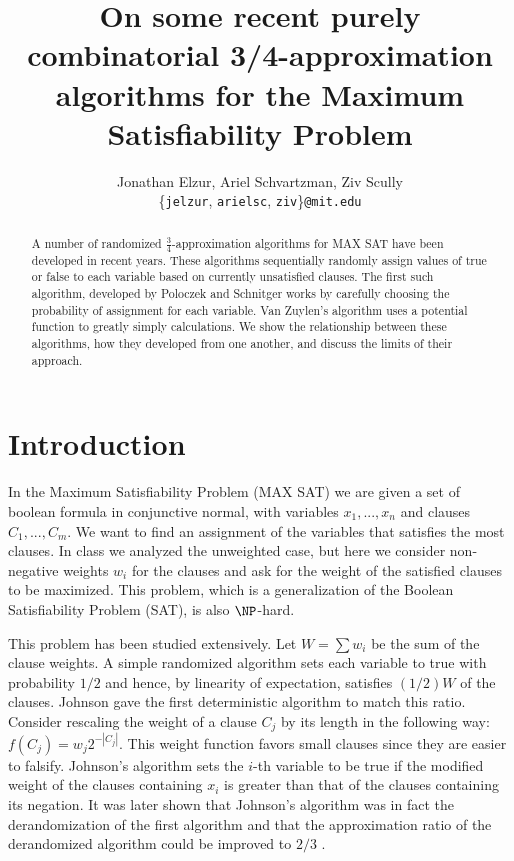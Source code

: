 \documentclass[11pt,letter]{article}
\numberwithin{theorem}{section}
\begin{document}

\title{On some recent purely combinatorial 3/4-approximation algorithms for the Maximum Satisfiability Problem}

\author{Jonathan Elzur, Ariel Schvartzman, Ziv Scully \\
  \{\texttt{jelzur}, \texttt{arielsc}, \texttt{ziv}\}\texttt{@mit.edu}}

\maketitle
\begin{abstract}
A number of randomized $\frac{3}{4}$-approximation algorithms for MAX SAT have been developed in recent years. These algorithms sequentially randomly assign values of true or false to each variable based on currently unsatisfied clauses. The first such algorithm, developed by Poloczek and Schnitger \cite{Poloczek:2011:RVJ:2133036.2133087} works by carefully choosing the probability of assignment for each variable. Van Zuylen's algorithm \cite{vanZuylen:2011:SAM:2238496.2238512} uses a potential function to greatly simply calculations. We show the relationship between these algorithms, how they developed from one another, and discuss the limits of their approach.
\end{abstract}

\section{Introduction}

In the Maximum Satisfiability Problem (MAX SAT) we are given a set of boolean formula in conjunctive normal, with 
variables $x_1, ..., x_n$ and clauses $C_1,...,C_m$. We want to find an 
assignment of the variables that satisfies the most clauses.
In class we analyzed the unweighted case, but here we consider non-negative weights $w_i$ for the clauses
and ask for the weight of the satisfied clauses to be maximized. This problem, which is a generalization of the
Boolean Satisfiability Problem (SAT), is also $\NP$-hard.

This problem has been studied extensively. Let $W = \sum w_i$ be the sum of the clause weights.
A simple randomized algorithm sets each variable to true with probability $1/2$ and hence,
by linearity of expectation, satisfies $(1/2)W$ of the clauses. Johnson \cite{Johnson1974256}
gave the first deterministic algorithm to match this ratio. Consider rescaling the weight of a clause $C_j$
by its length in the following way: $f(C_j) = w_j 2^{-|C_j|}$. This weight function favors small clauses
since they are easier to falsify. Johnson's algorithm sets the $i$-th variable to be true
if the modified weight of the clauses containing $x_i$ is greater than that of the clauses containing its negation.
It was later shown that Johnson's algorithm was in fact the derandomization of the first algorithm and that the
approximation ratio of the derandomized algorithm could be improved to $2/3$ \cite{Chen1999622}.
\end{document}
